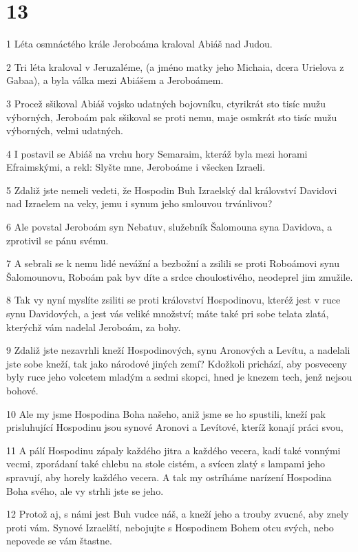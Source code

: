 \chapter{13}

\par 1 Léta osmnáctého krále Jeroboáma kraloval Abiáš nad Judou.
\par 2 Tri léta kraloval v Jeruzaléme, (a jméno matky jeho Michaia, dcera Urielova z Gabaa), a byla válka mezi Abiášem a Jeroboámem.
\par 3 Procež sšikoval Abiáš vojsko udatných bojovníku, ctyrikrát sto tisíc mužu výborných, Jeroboám pak sšikoval se proti nemu, maje osmkrát sto tisíc mužu výborných, velmi udatných.
\par 4 I postavil se Abiáš na vrchu hory Semaraim, kteráž byla mezi horami Efraimskými, a rekl: Slyšte mne, Jeroboáme i všecken Izraeli.
\par 5 Zdaliž jste nemeli vedeti, že Hospodin Buh Izraelský dal království Davidovi nad Izraelem na veky, jemu i synum jeho smlouvou trvánlivou?
\par 6 Ale povstal Jeroboám syn Nebatuv, služebník Šalomouna syna Davidova, a zprotivil se pánu svému.
\par 7 A sebrali se k nemu lidé nevážní a bezbožní a zsilili se proti Roboámovi synu Šalomounovu, Roboám pak byv díte a srdce choulostivého, neodeprel jim zmužile.
\par 8 Tak vy nyní myslíte zsiliti se proti království Hospodinovu, kteréž jest v ruce synu Davidových, a jest vás veliké množství; máte také pri sobe telata zlatá, kterýchž vám nadelal Jeroboám, za bohy.
\par 9 Zdaliž jste nezavrhli kneží Hospodinových, synu Aronových a Levítu, a nadelali jste sobe kneží, tak jako národové jiných zemí? Kdožkoli prichází, aby posveceny byly ruce jeho volcetem mladým a sedmi skopci, hned je knezem tech, jenž nejsou bohové.
\par 10 Ale my jsme Hospodina Boha našeho, aniž jsme se ho spustili, kneží pak prisluhující Hospodinu jsou synové Aronovi a Levítové, kteríž konají práci svou,
\par 11 A pálí Hospodinu zápaly každého jitra a každého vecera, kadí také vonnými vecmi, zporádaní také chlebu na stole cistém, a svícen zlatý s lampami jeho spravují, aby horely každého vecera. A tak my ostríháme narízení Hospodina Boha svého, ale vy strhli jste se jeho.
\par 12 Protož aj, s námi jest Buh vudce náš, a kneží jeho a trouby zvucné, aby znely proti vám. Synové Izraelští, nebojujte s Hospodinem Bohem otcu svých, nebo nepovede se vám štastne.
